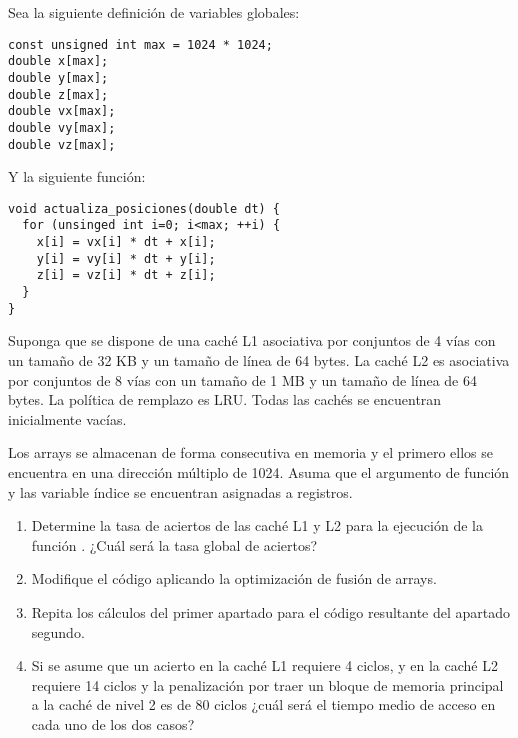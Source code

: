 \begin{acexercise}\end{acexercise}

Sea la siguiente definición de variables globales:
\begin{lstlisting}
const unsigned int max = 1024 * 1024;
double x[max];
double y[max];
double z[max];
double vx[max];
double vy[max];
double vz[max];
\end{lstlisting}

Y la siguiente función:

\begin{lstlisting}
void actualiza_posiciones(double dt) {
  for (unsinged int i=0; i<max; ++i) {
    x[i] = vx[i] * dt + x[i];
    y[i] = vy[i] * dt + y[i];
    z[i] = vz[i] * dt + z[i];
  }
}
\end{lstlisting}

Suponga que se dispone de una caché L1 asociativa por conjuntos de 4 vías con
un tamaño de 32 KB y un tamaño de línea de 64 bytes. La caché L2 es asociativa
por conjuntos de 8 vías con un tamaño de 1 MB y un tamaño de línea de 64 bytes.
La política de remplazo es LRU. Todas las cachés se encuentran inicialmente 
vacías.

Los arrays se almacenan de forma consecutiva en memoria y el primero ellos se
encuentra en una dirección múltiplo de 1024. Asuma que el argumento de función
 y las variable índice  se encuentran asignadas a registros.

\begin{enumerate}
  \item Determine la tasa de aciertos de las caché L1 y L2 para la ejecución de
	la función . ¿Cuál será la tasa global
        de aciertos?

  \item Modifique el código aplicando la optimización de fusión de arrays.

  \item Repita los cálculos del primer apartado para el código resultante del
        apartado segundo.

  \item Si se asume que un acierto en la caché L1 requiere 4 ciclos, y en la
	caché L2 requiere 14 ciclos y la penalización por traer un bloque de
	memoria principal a la caché de nivel 2 es de 80 ciclos ¿cuál será el
	tiempo medio de acceso en cada uno de los dos casos?  

\end{enumerate}


